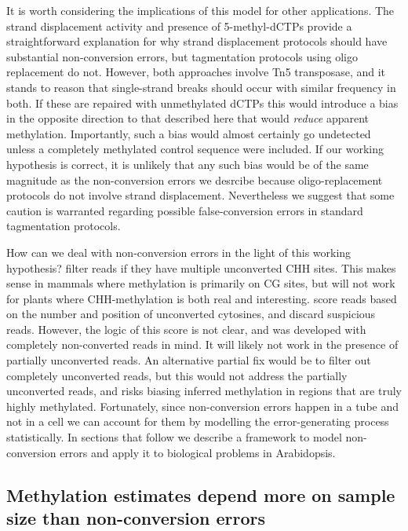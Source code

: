 \documentclass[12pt,longbibliography]{article}
\begin{document}
It is worth considering the implications of this model for other applications.
The strand displacement activity and presence of 5-methyl-dCTPs provide a straightforward explanation for why strand displacement protocols should have substantial non-conversion errors, but tagmentation protocols using oligo replacement do not.
However, both approaches involve Tn5 transposase, and it stands to reason that single-strand breaks should occur with similar frequency in both.
If these are repaired with unmethylated dCTPs this would introduce a bias in the opposite direction to that described here that would \textit{reduce} apparent methylation.
Importantly, such a bias would almost certainly go undetected unless a completely methylated control sequence were included.
If our working hypothesis is correct, it is unlikely that any such bias would be of the same magnitude as the non-conversion errors we desrcibe because oligo-replacement protocols do not involve strand displacement.
Nevertheless we suggest that some caution is warranted regarding possible false-conversion errors in standard tagmentation protocols.

How can we deal with non-conversion errors in the light of this working hypothesis?
\textcite{suzuki2018whole} filter reads if they have multiple unconverted CHH sites.
This makes sense in mammals where methylation is primarily on CG sites, but will not work for plants where CHH-methylation is both real and interesting.
\textcite{lu2015improved} score reads based on the number and position of unconverted cytosines, and discard suspicious reads.
However, the logic of this score is not clear, and was developed with completely non-converted reads in mind.
It will likely not work in the presence of partially unconverted reads.
An alternative partial fix would be to filter out completely unconverted reads, but this would not address the partially unconverted reads, and risks biasing inferred methylation in regions that are truly highly methylated.
Fortunately, since non-conversion errors happen in a tube and not in a cell we can account for them by modelling the error-generating process statistically.
In sections that follow we describe a framework to model non-conversion errors and apply it to biological problems in Arabidopsis.

\subsection{Methylation estimates depend more on sample size than non-conversion errors}
\end{document}
